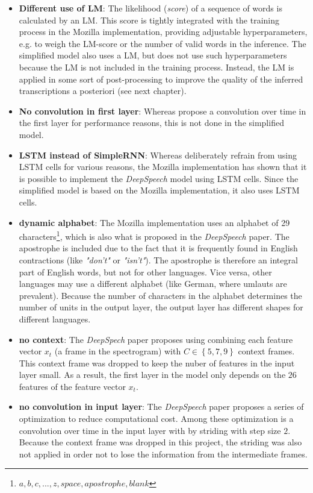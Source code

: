 \begin{itemize}
	\item \textbf{Different use of LM}: The likelihood (\textit{score}) of a sequence of words is calculated by an \ac{LM}. This score is tightly integrated with the training process in the Mozilla implementation, providing adjustable hyperparameters, e.g. to weigh the \ac{LM}-score or the number of valid words in the inference. The simplified model also uses a \ac{LM}, but does not use such hyperparameters because the \ac{LM} is not included in the training process. Instead, the \ac{LM} is applied in some sort of post-processing to improve the quality of the inferred transcriptions a posteriori (see next chapter).
	\item \textbf{No convolution in first layer}: Whereas \cite{ctc_paper} propose a convolution over time in the first layer for performance reasons, this is not done in the simplified model.
	\item \textbf{LSTM instead of SimpleRNN}: Whereas \cite{ctc_paper} deliberately refrain from using \ac{LSTM} cells for various reasons, the Mozilla implementation has shown that it is possible to implement the \textit{DeepSpeech} model using \ac{LSTM} cells. Since the simplified model is based on the Mozilla implementation, it also uses \ac{LSTM} cells.
	\item \textbf{dynamic alphabet}: The Mozilla implementation uses an alphabet of 29 characters\footnote{${a,b,c,...,z, space, apostrophe, blank}$}, which is also what is proposed in the \textit{DeepSpeech} paper. The apostrophe is included due to the fact that it is frequently found in English contractions (like \textit{"don't"} or \textit{"isn't"}). The apostrophe is therefore an integral part of English words, but not for other languages. Vice versa, other languages may use a different alphabet (like German, where umlauts are prevalent). Because the number of characters in the alphabet determines the number of units in the output layer, the output layer has different shapes for different languages.
	\item \textbf{no context}: The \textit{DeepSpech} paper proposes using combining each feature vector $x_t$ (a frame in the spectrogram) with $C \in \left\{ 5,7,9 \right\}$ context frames. This context frame was dropped to keep the nuber of features in the input layer small. As a result, the first layer in the model only depends on the $26$ features of the feature vector $x_t$.
	\item \textbf{no convolution in input layer}: The \textit{DeepSpeech} paper proposes a series of optimization to reduce computational cost. Among these optimization is a convolution over time in the input layer with by striding with step size $2$. Because the context frame was dropped in this project, the striding was also not applied in order not to lose the information from the intermediate frames.
\end{itemize}

